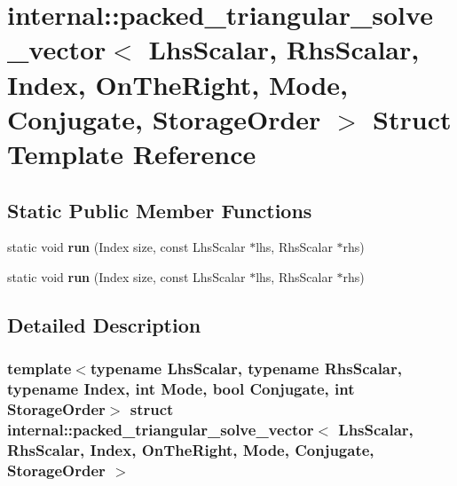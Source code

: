 \hypertarget{structinternal_1_1packed__triangular__solve__vector_3_01_lhs_scalar_00_01_rhs_scalar_00_01_indexbdf75792bc56c9c47813436504c36746}{}\section{internal\+:\+:packed\+\_\+triangular\+\_\+solve\+\_\+vector$<$ Lhs\+Scalar, Rhs\+Scalar, Index, On\+The\+Right, Mode, Conjugate, Storage\+Order $>$ Struct Template Reference}
\label{structinternal_1_1packed__triangular__solve__vector_3_01_lhs_scalar_00_01_rhs_scalar_00_01_indexbdf75792bc56c9c47813436504c36746}
\subsection*{Static Public Member Functions}
\begin{DoxyCompactItemize}
\item 
\mbox{\label{structinternal_1_1packed__triangular__solve__vector_3_01_lhs_scalar_00_01_rhs_scalar_00_01_indexbdf75792bc56c9c47813436504c36746_a453073b02ec8a717f090dffc05e388a0}} 
static void {\bfseries run} (Index size, const Lhs\+Scalar $\ast$lhs, Rhs\+Scalar $\ast$rhs)
\item 
\mbox{\label{structinternal_1_1packed__triangular__solve__vector_3_01_lhs_scalar_00_01_rhs_scalar_00_01_indexbdf75792bc56c9c47813436504c36746_a453073b02ec8a717f090dffc05e388a0}} 
static void {\bfseries run} (Index size, const Lhs\+Scalar $\ast$lhs, Rhs\+Scalar $\ast$rhs)
\end{DoxyCompactItemize}


\subsection{Detailed Description}
\subsubsection*{template$<$typename Lhs\+Scalar, typename Rhs\+Scalar, typename Index, int Mode, bool Conjugate, int Storage\+Order$>$\newline
struct internal\+::packed\+\_\+triangular\+\_\+solve\+\_\+vector$<$ Lhs\+Scalar, Rhs\+Scalar, Index, On\+The\+Right, Mode, Conjugate, Storage\+Order $>$}




